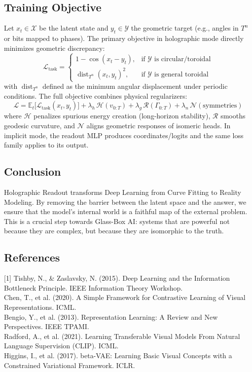\documentclass{article}
\numberwithin{equation}{section}
\begin{document}
\subsection{Training Objective}
Let $x_t \in \mathcal{X}$ be the latent state and $y_t \in \mathcal{Y}$ the geometric target (e.g., angles in $T^n$ or bits mapped to phases). The primary objective in holographic mode directly minimizes geometric discrepancy:
\[
\mathcal{L}_{\text{task}} =
\begin{cases}
1 - \cos(x_t - y_t), & \text{if } \mathcal{Y} \text{ is circular/toroidal}\\
\operatorname{dist}_{T^n}(x_t, y_t)^2, & \text{if } \mathcal{Y} \text{ is general toroidal}
\end{cases}
\]
with $\operatorname{dist}_{T^n}$ defined as the minimum angular displacement under periodic conditions. The full objective combines physical regularizers:
\[
\mathcal{L} = \mathbb{E}_{t}\big[\mathcal{L}_{\text{task}}(x_t, y_t)\big]
 + \lambda_h\,\mathcal{H}(v_{0:T}) 
 + \lambda_g\,\mathcal{R}(\Gamma_{0:T}) 
 + \lambda_n\,\mathcal{N}(\text{symmetries})
\]
where $\mathcal{H}$ penalizes spurious energy creation (long-horizon stability), $\mathcal{R}$ smooths geodesic curvature, and $\mathcal{N}$ aligns geometric responses of isomeric heads. In implicit mode, the readout MLP produces coordinates/logits and the same loss family applies to its output.

\subsection{Conclusion}
Holographic Readout transforms Deep Learning from Curve Fitting to Reality Modeling. By removing the barrier between the latent space and the answer, we ensure that the model's internal world is a faithful map of the external problem. This is a crucial step towards Glass-Box AI: systems that are powerful not because they are complex, but because they are isomorphic to the truth.

\subsection*{References}
[1] Tishby, N., \& Zaslavsky, N. (2015). Deep Learning and the Information Bottleneck Principle. IEEE Information Theory Workshop.\\
[2] Chen, T., et al. (2020). A Simple Framework for Contrastive Learning of Visual Representations. ICML.\\
[3] Bengio, Y., et al. (2013). Representation Learning: A Review and New Perspectives. IEEE TPAMI.\\
[4] Radford, A., et al. (2021). Learning Transferable Visual Models From Natural Language Supervision (CLIP). ICML.\\
[5] Higgins, I., et al. (2017). beta-VAE: Learning Basic Visual Concepts with a Constrained Variational Framework. ICLR.
\end{document}

